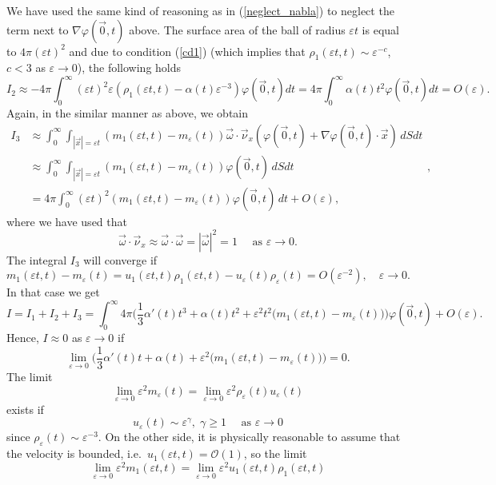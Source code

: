 \documentclass[reqno]{article}%
\theoremstyle{plain}
\theoremstyle{definition}
\theoremstyle{remark}
\numberwithin{equation}{section}
\begin{document}
We have used the same kind of reasoning as in (\ref{neglect_nabla}) to neglect the term next to $\nabla \varphi(\vec{0},t)$ above.
The surface area of the ball of radius $\varepsilon t$  is equal to $ 4\pi(\varepsilon t)^2$ and due to condition (\ref{cd1}) (which implies that $\rho_1(\varepsilon t,t)\sim \varepsilon^{-c}$, $c<3$ as $\varepsilon\to 0$), the following holds
\[I_2\approx -4\pi \int_0^\infty (\varepsilon t)^2 \varepsilon (\rho_1(\varepsilon t,t)-\alpha(t)\varepsilon^{-3})\varphi(\vec{0},t)dt= 4\pi \int_0^\infty \alpha(t)t^2 \varphi(\vec{0},t)dt =O(\varepsilon).\]
Again, in the similar manner as above,
 we obtain
\[\begin{split}
I_3&\approx \int_0^\infty\int_{|\vec{x}|=\varepsilon t}(m_1(\varepsilon t,t)-m_\varepsilon(t)) \vec{\omega}\cdot \vec{\nu}_x (\varphi(\vec{0},t)+\nabla \varphi(\vec{0},t)\cdot \vec{x})\,dSdt\\
&\approx  \int_0^\infty\int_{|\vec{x}|=\varepsilon t}(m_1(\varepsilon t,t)-m_\varepsilon(t))  \varphi(\vec{0},t)\,dSdt\\
&=4\pi \int_0^\infty (\varepsilon t)^2 (m_1(\varepsilon t,t)-m_\varepsilon(t))  \varphi(\vec{0},t)\,dt +O(\varepsilon),
\end{split},\]
where we have used that
\[\vec{\omega}\cdot \vec{\nu}_x\approx \vec{\omega}\cdot \vec{\omega}=|\vec{\omega}|^2=1 \quad \text{ as } \varepsilon\to 0.\]
The integral $I_3$ will converge if
\begin{equation}\label{assum2}
m_1(\varepsilon t, t)-m_\varepsilon(t)=u_1(\varepsilon t,t)\rho_1(\varepsilon t, t)-u_\varepsilon(t)\rho_\varepsilon(t)=O(\varepsilon^{-2}),\quad \varepsilon \to 0.
\end{equation}
In that case we get
\[I=I_1+I_2+I_3=\int_0^\infty 4\pi\Big(\frac{1}{3} \alpha'(t)t^3+\alpha(t)t^2+\varepsilon^2t^2 \big(m_1(\varepsilon t,t)-m_\varepsilon(t)\big)\Big)\varphi(\vec{0},t)+O(\varepsilon).\]
Hence,
$I\approx 0$ as $\varepsilon\to 0$ if
\[\lim_{\varepsilon\to 0}\Big(\frac{1}{3} \alpha'(t)t+\alpha(t)+\varepsilon^2 \big(m_1(\varepsilon t,t)-m_\varepsilon(t)\big)\Big)=0.\]
The limit
\[\lim_{\varepsilon\to 0} \varepsilon^2 m_\varepsilon(t)=\lim_{\varepsilon\to 0} \varepsilon^2 \rho_\varepsilon(t)u_\varepsilon(t)\]
exists if 
\[u_\varepsilon(t)\sim \varepsilon^\gamma, \; \gamma\geq 1 \quad\text{ as } \varepsilon\to 0\]
since $\rho_\varepsilon(t)\sim \varepsilon^{-3}$.
On the other side, it is physically reasonable to assume that the velocity is bounded, i.e.\ $u_1(\varepsilon t,t)=\mathcal{O}(1)$, so the limit
\[\lim_{\varepsilon\to 0} \varepsilon^2 m_1(\varepsilon t,t)=\lim_{\varepsilon\to 0} \varepsilon^2 u_1(\varepsilon t,t)\rho_1(\varepsilon t,t)\]
\end{document}
